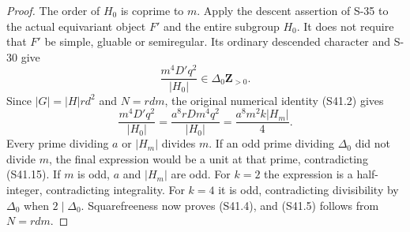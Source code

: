 \begin{proof}
The order of \(H_0\) is coprime to \(m\). Apply the descent assertion of S-35 to the actual equivariant object \(F'\) and the entire subgroup \(H_0\). It does not require that \(F'\) be simple, gluable or semiregular. Its ordinary descended character and S-30 give \[
 \frac{m^4D'q^2}{|H_0|}\in\Delta_0\mathbf Z_{>0}.
 \tag{S41.15}
\] Since \(|G|=|H|rd^2\) and \(N=rdm\), the original numerical identity (S41.2) gives \[
 \frac{m^4D'q^2}{|H_0|}
  =\frac{a^8rD m^4q^2}{|H_0|}
  =\frac{a^8m^2 k |H_m|}{4}.
 \tag{S41.16}
\] Every prime dividing \(a\) or \(|H_m|\) divides \(m\). If an odd prime dividing \(\Delta_0\) did not divide \(m\), the final expression would be a unit at that prime, contradicting (S41.15). If \(m\) is odd, \(a\) and \(|H_m|\) are odd. For \(k=2\) the expression is a half-integer, contradicting integrality. For \(k=4\) it is odd, contradicting divisibility by \(\Delta_0\) when \(2\mid\Delta_0\). Squarefreeness now proves (S41.4), and (S41.5) follows from \(N=rdm\).
\end{proof}



